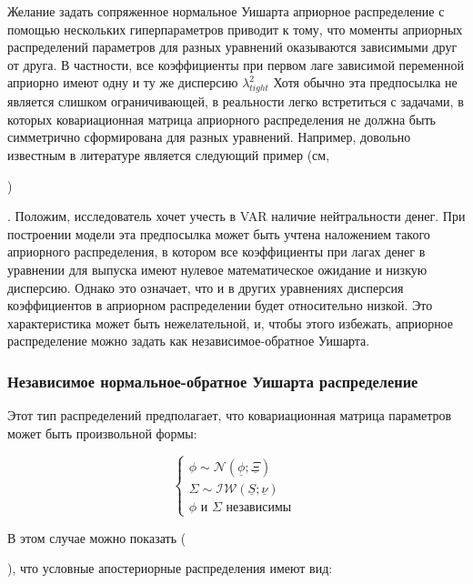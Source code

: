 \documentclass[11pt]{article} %
\newcommand{\cN}{\mathcal{N}}
\newcommand{\cIW}{\mathcal{IW}}
\newcommand{\prior}{\underline}
\newcommand{\eng}[1]{\begin{otherlanguage}{english}#1\end{otherlanguage}}
\begin{document}

Желание задать сопряженное нормальное Уишарта априорное распределение с помощью нескольких гиперпараметров приводит к тому, что моменты априорных распределений параметров для разных уравнений оказываются зависимыми друг от друга. В частности, все коэффициенты при первом лаге зависимой переменной априорно имеют одну и ту же дисперсию $\lambda_{tight}^2$  Хотя обычно эта предпосылка не является слишком ограничивающей, в реальности легко встретиться с задачами, в которых ковариационная матрица априорного распределения не должна быть симметрично сформирована для разных уравнений. Например, довольно известным в литературе является следующий пример (см, \eng{\cite{kadiyala_karlsson_1997})}. Положим, исследователь хочет  учесть в VAR наличие нейтральности денег. При построении модели эта предпосылка может быть учтена наложением такого априорного распределения, в котором все коэффициенты при лагах денег в уравнении для выпуска имеют нулевое математическое ожидание и низкую дисперсию. Однако это означает, что и в других уравнениях дисперсия коэффициентов в априорном распределении будет относительно низкой. Это характеристика может быть нежелательной, и, чтобы этого избежать,   априорное распределение можно задать как независимое-обратное Уишарта.

\subsubsection{Независимое нормальное-обратное Уишарта распределение}

Этот тип распределений предполагает, что ковариационная матрица параметров может быть произвольной формы:

\begin{equation}
\begin{cases}
\phi \sim \cN(\prior\phi; \prior\Xi ) \\
\Sigma \sim \cIW(\prior S; \prior\nu) \\
\phi \text{ и } \Sigma \text{ независимы }
\end{cases}
\end{equation}


В этом случае можно показать (\eng{\cite{karlsson_2012}}), что условные апостериорные распределения имеют вид:
\end{document}
